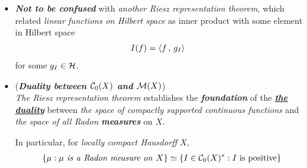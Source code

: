 \documentclass[11pt]{article}
\begin{document}
\begin{itemize}
\item \begin{remark}
\emph{\textbf{Not to be confused}} with \emph{another Riesz representation theorem}, which related \emph{linear functions on Hilbert space} as inner product with some element in Hilbert space
\begin{align*}
I(f) &= \left\langle f\,,\, g_{I} \right\rangle
\end{align*} for some $g_{I} \in {\mathcal H}$.
\end{remark}

\item \begin{remark} (\emph{\textbf{Duality between ${\mathcal C}_{0}(X)$ and ${\mathcal M}(X)$}})\\
\emph{The Riesz representation theorem} establishes the \emph{\textbf{foundation}} of the \underline{\emph{\textbf{the duality}}} between \emph{the space of compactly supported continuous functions} and \emph{the space of all Radon \textbf{measures}} on $X$. 

In particular, for \emph{locally compact Hausdorff} $X$, 
\begin{align*}
\left\{\mu: \mu \text{\emph{ is a Radon measure on }}X\right\} \simeq \left\{I \in {\mathcal C}_{0}(X)^{*}: I \text{ is positive}\right\}
\end{align*}
\end{remark}
\end{itemize}
\end{document}
